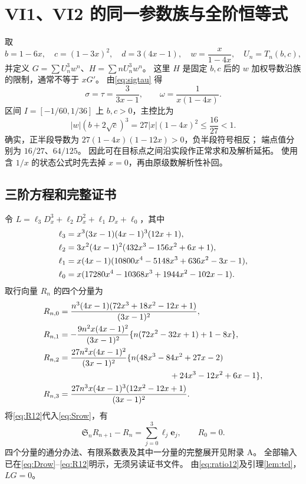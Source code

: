 \documentclass[11pt,a4paper]{article}
\numberwithin{equation}{section}
\theoremstyle{remark}\newtheorem{remark}[theorem]{说明}
\newcommand{\ee}{\boldsymbol e}
\newcommand{\Sop}{\mathfrak S}
\begin{document}
\section{VI1、VI2 的同一参数族与全阶恒等式}
取
\begin{equation}\label{eq:fam12}
 b=1-6x,\quad c=(1-3x)^2,\quad d=3(4x-1),\quad
 w=\frac{x}{1-4x},\quad U_n=T_n(b,c),
\end{equation}
并定义 $G=\sum U_n^3w^n$、$H=\sum nU_n^3w^n$。
这里 $H$ 是固定 $b,c$ 后的 $w$ 加权导数沿族的限制，通常不等于 $xG'$。
由\eqref{eq:sigtau} 得
\[
 \sigma=\tau=\frac3{3x-1},\qquad \omega=\frac1{x(1-4x)}.
\]
区间 $I=[-1/60,1/36]$ 上 $b,c>0$，主控比为
\begin{equation}\label{eq:ratio12}
 |w|(b+2\sqrt c)^3=27|x|(1-4x)^2\le\frac{16}{27}<1.
\end{equation}
确实，正半段导数为 $27(1-4x)(1-12x)>0$，负半段符号相反；
端点值分别为 $16/27$、$64/125$。
因此可在目标点之间沿实段作正常求和及解析延拓。
使用含 $1/x$ 的状态公式时先去掉 $x=0$，再由原级数解析性补回。

\subsection{三阶方程和完整证书}
令 $L=\ell_3D_x^3+\ell_2D_x^2+\ell_1D_x+\ell_0$，其中
\begin{align}
 \ell_3&=x^3(3x-1)(4x-1)^3(12x+1),\notag\\
 \ell_2&=3x^2(4x-1)^2(432x^3-156x^2+6x+1),\notag\\
 \ell_1&=x(4x-1)(10800x^4-5148x^3+636x^2-3x-1),\label{eq:L12}\\
 \ell_0&=x(17280x^4-10368x^3+1944x^2-102x-1).\notag
\end{align}
取行向量 $R_n$ 的四个分量为
\begin{align}
 R_{n,0}&=\frac{n^3(4x-1)(72x^3+18x^2-12x+1)}{(3x-1)^2},\notag\\
 R_{n,1}&=-\frac{9n^2x(4x-1)^2}{(3x-1)^2}
       \{n(72x^2-32x+1)+1-8x\},\notag\\
 R_{n,2}&=\frac{27n^2x(4x-1)^2}{(3x-1)^2}
       \{n(48x^3-84x^2+27x-2)\notag\\
 &\hspace{47mm}{}+24x^3-12x^2+6x-1\},\label{eq:R12}\\
 R_{n,3}&=\frac{27n^3x(4x-1)^3(12x^2-12x+1)}{(3x-1)^2}.\notag
\end{align}
将\eqref{eq:R12}代入\eqref{eq:Srow}，有
\begin{equation}\label{eq:cert12}
 \Sop_nR_{n+1}-R_n=\sum_{j=0}^3\ell_j\ee_j,\qquad R_0=0.
\end{equation}
四个分量的通分办法、有限系数表及其中一分量的完整展开见附录 A。
全部输入已在\eqref{eq:Drow}--\eqref{eq:R12}明示，无须另读证书文件。
由\eqref{eq:ratio12}及引理\ref{lem:tel}，$LG=0$。
\end{document}
